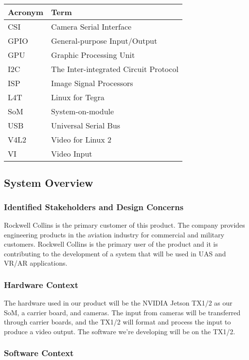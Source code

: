 \begin{tabular}{|l|l|}
	\hline
	\textbf{Acronym} & \textbf{Term}\\
	\hline
	CSI & Camera Serial Interface\\
	\hline
	GPIO & General-purpose Input/Output\\
	\hline
	GPU & Graphic Processing Unit\\
	\hline
	I2C & The Inter-integrated Circuit Protocol\\
	\hline
	ISP & Image Signal Processors\\
	\hline
	L4T & Linux for Tegra \\
	\hline
	SoM & System-on-module\\
	\hline
	USB & Universal Serial Bus\\
	\hline
	V4L2 & Video for Linux 2 \\
	\hline
	VI & Video Input\\
	\hline
\end{tabular}

\newpage
\subsection{System Overview}  

\subsubsection{Identified Stakeholders and Design Concerns}

Rockwell Collins is the primary customer of this product. The company provides 
engineering products in the aviation industry for commercial and military customers. 
Rockwell Collins is the primary user of the product and it is contributing 
to the development of a system that will be used in UAS and VR/AR applications. \\

\subsubsection{Hardware Context}

The hardware used in our product will be the NVIDIA Jetson TX1/2 as our SoM, 
a carrier board, and cameras. The input from cameras will be transferred through 
carrier boards, and the TX1/2 will format and process the input to produce a 
video output. The software we're developing will be on the TX1/2. \\

\subsubsection{Software Context}

